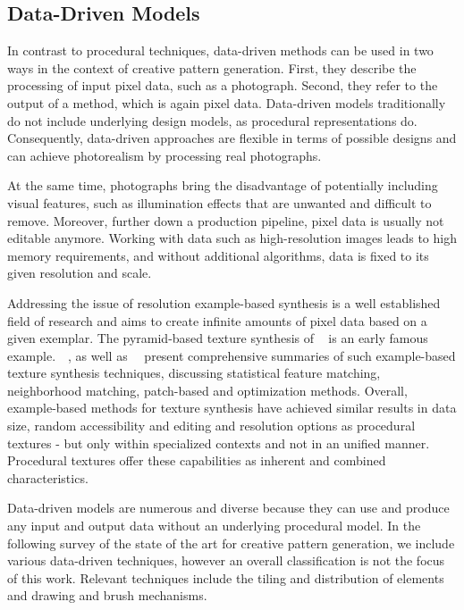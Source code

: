 \subsection[Data-Driven]{Data-Driven Models}
\label{subsec:design_models_datadriven}

In contrast to procedural techniques, data-driven methods can be used in two ways in the context of creative pattern generation. First, they describe the processing of input pixel data, such as a photograph. Second, they refer to the output of a method, which is again pixel data. Data-driven models traditionally do not include underlying design models, as procedural representations do. Consequently, data-driven approaches are flexible in terms of possible designs and can achieve photorealism by processing real photographs.

At the same time, photographs bring the disadvantage of potentially including visual features, such as illumination effects that are unwanted and difficult to remove. Moreover, further down a production pipeline, pixel data is usually not editable anymore. Working with data such as high-resolution images leads to high memory requirements, and without additional algorithms, data is fixed to its given resolution and scale.

Addressing the issue of resolution example-based synthesis is a well established field of research and aims to create infinite amounts of pixel data based on a given exemplar. The pyramid-based texture synthesis of \citeauthor*{heeger_1995_pbt}~\cite{heeger_1995_pbt} is an early famous example.~\citeauthor*{wei_2009_seb}~\cite{wei_2009_seb}, as well as~\citeauthor*{barnes_2017_aso}~\cite{barnes_2017_aso} present comprehensive summaries of such example-based texture synthesis techniques, discussing statistical feature matching, neighborhood matching, patch-based and optimization methods. Overall, example-based methods for texture synthesis have achieved similar results in data size, random accessibility and editing and resolution options as procedural textures - but only within specialized contexts and not in an unified manner. Procedural textures offer these capabilities as inherent and combined characteristics.

Data-driven models are numerous and diverse because they can use and produce any input and output data without an underlying procedural model. In the following survey of the state of the art for creative pattern generation, we include various data-driven techniques, however an overall classification is not the focus of this work. Relevant techniques include the tiling and distribution of elements and drawing and brush mechanisms.

